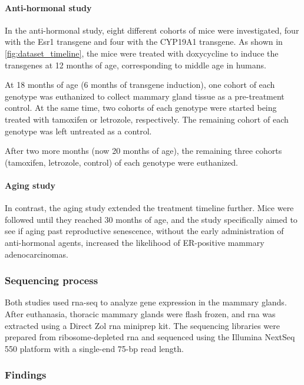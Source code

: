 \paragraph{Anti-hormonal study}
In the anti-hormonal study, eight different cohorts of mice were investigated,
four with the Esr1 transgene and four with the CYP19A1 transgene.
As shown in \cref{fig:dataset_timeline}, the mice were treated with doxycycline
to induce the transgenes at 12 months of age, corresponding to middle age in
humans.

At 18 months of age (6 months of transgene induction), one cohort of each
genotype was euthanized to collect mammary gland tissue as a pre-treatment
control.
At the same time, two cohorts of each genotype were started being treated with
tamoxifen or letrozole, respectively.
The remaining cohort of each genotype was left untreated as a control.

After two more months (now 20 months of age), the remaining three cohorts
(tamoxifen, letrozole, control) of each genotype were
euthanized\supercite{furth_esr1_2023}.

\paragraph{Aging study}
In contrast, the aging study extended the treatment timeline further.
Mice were followed until they reached 30 months of age, and the study
specifically aimed to see if aging past reproductive senescence, without the
early administration of anti-hormonal agents, increased the likelihood of
ER-positive mammary adenocarcinomas\supercite{furth_overexpression_2023}.

\subsubsection{Sequencing process}
\label{sec:dataset_sequencing}
Both studies used \gls{rna-seq} to analyze gene expression in the mammary
glands.
After euthanasia, thoracic mammary glands were flash frozen, and \gls{rna} was
extracted using a Direct Zol \gls{rna} miniprep kit.
The sequencing libraries were prepared from ribosome-depleted \gls{rna} and
sequenced using the Illumina NextSeq 550 platform with a single-end 75-bp read
length\supercite{furth_esr1_2023,furth_overexpression_2023}.

\subsubsection{Findings}

